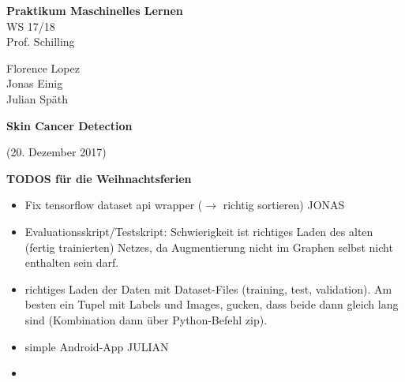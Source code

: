 \documentclass[%
   10pt,              %
   a4paper,           %
   DIV10,             %
]{scrartcl}%
\def\header#1#2#3#4#5#6{\pagestyle{empty}
\noindent
\begin{minipage}[t]{0.6\textwidth}
\begin{flushleft}
\textbf{#4}\\%
#6\\%
#2  %
\end{flushleft}
\end{minipage}
\begin{minipage}[t]{0.4\textwidth}
\begin{flushright}
\vspace*{0.2cm}
#5%
\end{flushright}
\end{minipage}

\begin{center}
{\Large\textbf{ #1}} %

{(#3)} %
\end{center}
}
\begin{document}
\header{Skin Cancer Detection}{Prof. Schilling}{20. Dezember 2017}{Praktikum Maschinelles Lernen}{Florence Lopez \\ Jonas Einig \\ Julian Späth}{WS 17/18}

\textbf{TODOS für die Weihnachtsferien }
\begin{itemize}
	\item Fix tensorflow dataset api wrapper ($\rightarrow$ richtig sortieren) {\color{red} JONAS} 
	\item Evaluationsskript/Testskript: Schwierigkeit ist richtiges Laden des alten (fertig trainierten) Netzes, da Augmentierung nicht im Graphen selbst nicht enthalten sein darf. 
	\item richtiges Laden der Daten mit Dataset-Files (training, test, validation). Am besten ein Tupel mit Labels und Images, gucken, dass beide dann gleich lang sind (Kombination dann über Python-Befehl zip). 
	\item simple Android-App {\color{red} JULIAN}
	\item 
	
\end{itemize}
\end{document}
